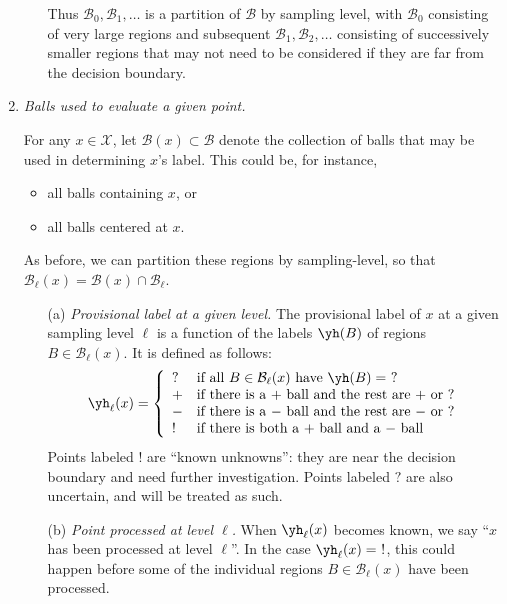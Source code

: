 \documentclass{article}
\def\X{{\mathcal X}}
\def\B{{\mathcal B}}
\begin{document}
\begin{enumerate}
\begin{enumerate}
Thus $\B_0, \B_1, \ldots$ is a partition of $\B$ by sampling level, with $\B_0$ consisting of very large regions and subsequent $\B_1, \B_2, \ldots$ consisting of successively smaller regions that may not need to be considered if they are far from the decision boundary.

\end{enumerate}

\item {\it Balls used to evaluate a given point.}

For any $x \in \X$, let $\B(x) \subset \B$ denote the collection of balls that may be used in determining $x$'s label. This could be, for instance,
\begin{itemize}
\item all balls containing $x$, or
\item all balls centered at $x$.
\end{itemize}
As before, we can partition these regions by sampling-level, so that $\B_\ell(x) = \B(x) \cap \B_\ell$.

\begin{enumerate}
\item[(a)] {\it Provisional label at a given level.} The provisional label of $x$ at a given sampling level $\ell$ is a function of the labels $\yh(B)$ of regions $B \in \B_\ell(x)$. It is defined as follows:
\begin{equation}
\yh_\ell(x) = 
\left\{
\begin{array}{ll}
? & \mbox{if all $B \in \B_\ell(x)$ have $\yh(B) = \ ?$} \\
+ & \mbox{if there is a $+$ ball and the rest are $+$ or $?$} \\ 
- & \mbox{if there is a $-$ ball and the rest are $-$ or $?$} \\ 
! & \mbox{if there is both a $+$ ball and a $-$ ball}
\end{array}
\right.
\label{eq:provisional-label}
\end{equation}
Points labeled $!$ are ``known unknowns'': they are near the decision boundary and need further investigation. Points labeled $?$ are also uncertain, and will be treated as such.

\item[(b)] {\it Point processed at level $\ell$.} When $\yh_\ell(x)$ becomes known, we say ``$x$ has been processed at level $\ell$''. In the case $\yh_\ell(x) = \ !$, this could happen before some of the individual regions $B \in \B_\ell(x)$ have been processed.


\end{enumerate}
\end{enumerate}
\end{document}
